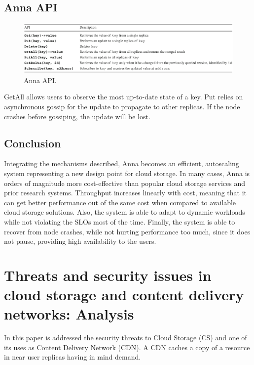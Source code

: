 \documentclass[14pt,oneside]{extreport}
\newcommand*\fpar{\hspace{1ex}}
\begin{document}
  \section{Anna API}
  
  \begin{figure}[H]
    \centerline{\includegraphics[scale=0.5]{images/paper2/API.png}}
    \caption{Anna API.}
    \label{Anna API.}
  \end{figure}

  \fpar GetAll allows users to observe the most up-to-date state of a key. Put relies on asynchronous gossip for the update to propagate to other replicas. If the node crashes before gossiping, the update will be lost.

  \section{Conclusion}
  \fpar Integrating the mechanisms described, Anna becomes an efficient, autoscaling system representing a new design point for cloud storage. In many cases, Anna is orders of magnitude more cost-effective than popular cloud storage services and prior research systems. Throughput increases linearly with cost, meaning that it can get better performance out of the same cost when compared to available cloud storage solutions. Also, the system is able to adapt to dynamic workloads while not violating the SLOs most of the time. Finally, the system is able to recover from node crashes, while not hurting performance too much, since it does not pause, providing high availability to the users.

\chapter{\Large{Threats and security issues in cloud storage and content delivery networks: Analysis \cite{paper3}}}
\vspace{-2em}
\fpar In this paper is addressed the security threats to Cloud Storage (CS) and one of its uses as Content Delivery Network (CDN). A CDN caches a copy of a resource in near user replicas having in mind demand.
\end{document}
